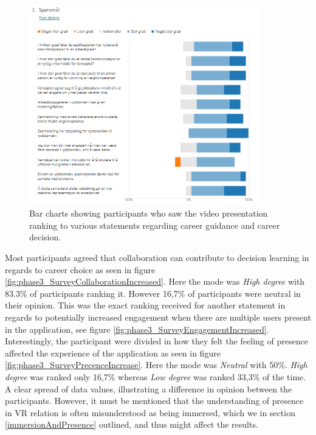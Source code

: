 \begin{figure}[H]
  \centering
   \captionsetup{width=.8\linewidth}
    \includegraphics[width=0.9\textwidth]{fig/phase_3/survey/valgKompentanseVideoPNG.PNG}
 \caption{Bar charts showing participants who saw the video presentation ranking to various statements regarding career guidance and career decision.}
\label{fig:phase3_SurveyValgkompVideo}
\end{figure}






Most participants agreed that collaboration can contribute to decision learning in regards to career choice as seen in figure \ref{fig:phase3_SurveyCollaborationIncreased}. Here the mode was \textit{High degree} with 83.3\% of participants ranking it. However 16,7\% of participants were neutral in their opinion. This was the exact ranking received for another statement in regards to potentially increased engagement when there are multiple users present in the application, see figure \ref{fig:phase3_SurveyEngagementIncreased}. Interestingly, the participant were divided in how they felt the feeling of presence affected the experience of the application as seen in figure \ref{fig:phase3_SurveyPrecenceIncrease}. Here the mode was \textit{Neutral} with 50\%. \textit{High degree} was ranked only 16,7\% whereas \textit{Low degree} was ranked 33,3\% of the time. A clear spread of data values, illustrating a difference in opinion between the participants. However, it must be mentioned that the understanding of presence in VR relation is often misunderstood as being immersed, which we in section \ref{immersionAndPresence} outlined, and thus might affect the results.       


